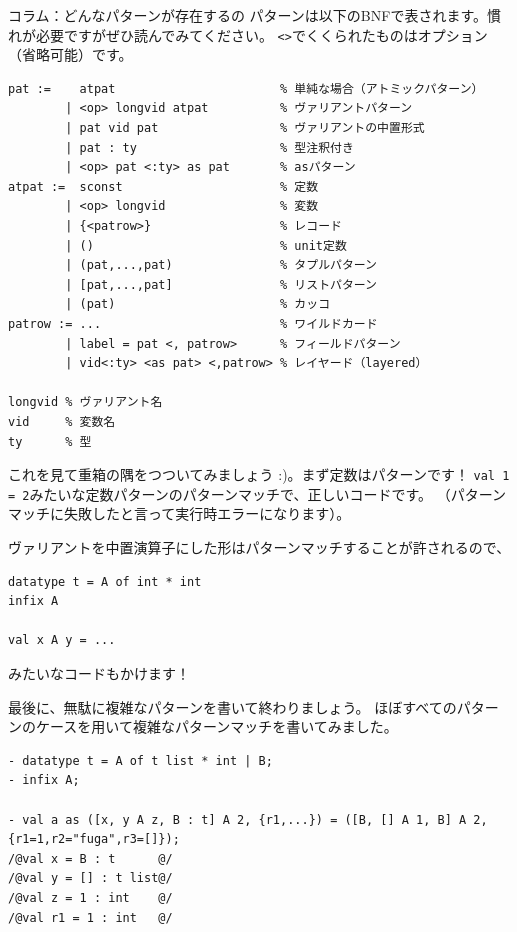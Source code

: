 \documentclass[11pt,a4paper]{article}
\begin{document}
\begin{itembox}[l]{コラム：どんなパターンが存在するの}
  パターンは以下のBNFで表されます。慣れが必要ですがぜひ読んでみてください。
  \lstinline{<>}でくくられたものはオプション（省略可能）です。
\begin{Verbatim}
pat :=    atpat                       % 単純な場合（アトミックパターン）
        | <op> longvid atpat          % ヴァリアントパターン
        | pat vid pat                 % ヴァリアントの中置形式
        | pat : ty                    % 型注釈付き
        | <op> pat <:ty> as pat       % asパターン
atpat :=  sconst                      % 定数
        | <op> longvid                % 変数
        | {<patrow>}                  % レコード
        | ()                          % unit定数
        | (pat,...,pat)               % タプルパターン
        | [pat,...,pat]               % リストパターン
        | (pat)                       % カッコ
patrow := ...                         % ワイルドカード
        | label = pat <, patrow>      % フィールドパターン
        | vid<:ty> <as pat> <,patrow> % レイヤード（layered）

longvid % ヴァリアント名
vid     % 変数名
ty      % 型
\end{Verbatim}

これを見て重箱の隅をつついてみましょう :)。まず定数はパターンです！
\lstinline{val 1 = 2}みたいな定数パターンのパターンマッチで、正しいコードです。
（パターンマッチに失敗したと言って実行時エラーになります）。

ヴァリアントを中置演算子にした形はパターンマッチすることが許されるので、
\begin{lstlisting}[caption=中置形式のヴァリアントのパターンマッチ]
datatype t = A of int * int
infix A

val x A y = ...
\end{lstlisting}
みたいなコードもかけます！

最後に、無駄に複雑なパターンを書いて終わりましょう。
ほぼすべてのパターンのケースを用いて複雑なパターンマッチを書いてみました。
\begin{lstlisting}[caption=複雑なパターン]
- datatype t = A of t list * int | B;
- infix A;

- val a as ([x, y A z, B : t] A 2, {r1,...}) = ([B, [] A 1, B] A 2, {r1=1,r2="fuga",r3=[]});
/@val x = B : t      @/
/@val y = [] : t list@/
/@val z = 1 : int    @/
/@val r1 = 1 : int   @/

\end{lstlisting}
\end{itembox}
\end{document}
